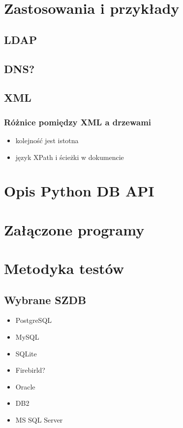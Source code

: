 \documentclass[10pt,a4paper,oneside]{book}
\begin{document}
\chapter{Zastosowania i przykłady}

\section{LDAP}
\section{DNS?}
\section{XML}
\subsection{Różnice pomiędzy XML a drzewami}
\begin{itemize}
 \item kolejność jest istotna
 \item język XPath i ścieżki w dokumencie
\end{itemize}

\appendix

\chapter{Opis Python DB API}

\chapter{Załączone programy}

\chapter{Metodyka testów}
\section{Wybrane SZDB}
\begin{itemize}
 \item PostgreSQL
 \item MySQL
 \item SQLite
 \item Firebirld?
 \item Oracle
 \item DB2
 \item MS SQL Server
\end{itemize}
\end{document}
